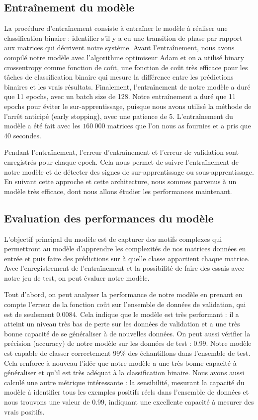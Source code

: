 \documentclass[11pt, parskip=half]{scrartcl} %
\begin{document}
\subsection{Entraînement du modèle}
La procédure d’entraînement consiste à entraîner le modèle à réaliser une classification binaire : identifier s’il y a eu une transition de phase par rapport aux matrices qui décrivent notre système. Avant l’entraînement, nous avons compilé notre modèle avec l’algorithme optimiseur Adam et on a utilisé binary crossentropy comme fonction de coût, une fonction de coût très efficace pour les tâches de classification binaire qui mesure la différence entre les prédictions binaires et les vrais résultats. Finalement, l’entraînement de notre modèle a duré que 11 epochs, avec un batch size de 128. Notre entraînement a duré que 11 epochs pour éviter le sur-apprentissage, puisque nous avons utilisé la méthode de l’arrêt anticipé (early stopping), avec une patience de 5. L’entraînement du modèle a été fait avec les $160 \ 000$ matrices que l'on nous as fournies et a pris que 40 secondes.

Pendant l’entraînement, l’erreur d’entraînement et l’erreur de validation sont enregistrés pour chaque epoch. Cela nous permet de suivre l’entraînement de notre modèle et de détecter des signes de sur-apprentissage ou sous-apprentissage. En suivant cette approche et cette architecture, nous sommes parvenus à un modèle très efficace, dont nous allons étudier les performances maintenant.

\subsection{Evaluation des performances du modèle}
L’objectif principal du modèle est de capturer des motifs complexes qui permettront au modèle d’apprendre les complexités de nos matrices données en entrée et puis faire des prédictions sur à quelle classe appartient chaque matrice. Avec l’enregistrement de l’entraînement et la possibilité de faire des essais avec notre jeu de test, on peut évaluer notre modèle.

Tout d’abord, on peut analyser la performance de notre modèle en prenant en compte l’erreur de la fonction coût sur l’ensemble de données de validation, qui est de seulement  0.0084. Cela indique que le modèle est très performant : il a atteint un niveau très bas de perte sur les données de validation et a une très bonne capacité de se généraliser à de nouvelles données. On peut aussi vérifier la précision (accuracy) de notre modèle sur les données de test : 0.99. Notre modèle est capable de classer correctement 99\% des échantillons dans l’ensemble de test. Cela renforce à nouveau l’idée que notre modèle a une très bonne capacité à généraliser et qu’il est très adéquat à la classification binaire. Nous avons aussi calculé une autre métrique intéressante : la sensibilité, mesurant la capacité du modèle à identifier tous les exemples positifs réels dans l'ensemble de données et nous trouvons une valeur de 0.99, indiquant une excellente capacité à mesurer des vrais positifs.
\end{document}

